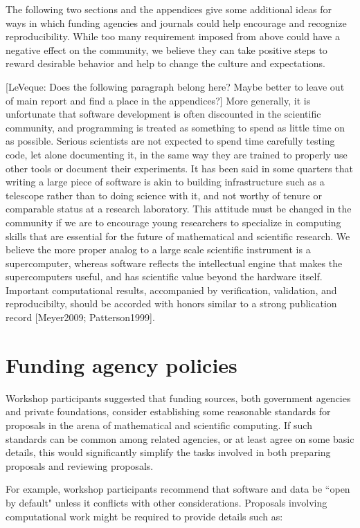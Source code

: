 \documentclass[11pt]{article}
\newcommand{\comment}[1]{{\color{blue} [#1]}}
\newcommand{\comment}[1]{}
\begin{document}
The following two sections and the appendices give some additional 
ideas for ways in which funding agencies and journals could help encourage
and recognize reproducibility.  While too many requirement imposed from
above could have a negative effect on the community, we believe they can
take positive steps to reward desirable behavior and help to change the
culture and expectations.

\comment{LeVeque:  Does the following paragraph belong here? Maybe better to
leave out of main report and find a place in the appendices?}
More generally, it is unfortunate that software development is often
discounted in the scientific community, and programming is treated
as something to spend as little time on as possible.  Serious
scientists are not expected to spend time carefully testing code,
let alone documenting it, in the same way they are trained to
properly use other tools or document their experiments.  It has
been said in some quarters that writing a large piece of software
is akin to building infrastructure such as a telescope rather than
to doing science with it, and not worthy of tenure or comparable
status at a research laboratory.  This attitude must be changed in
the community if we are to encourage young researchers to specialize
in computing skills that are essential for the future of mathematical
and scientific research.  We believe the more proper analog to a
large scale scientific instrument is a supercomputer,  whereas
software reflects the intellectual engine that makes the supercomputers
useful, and has scientific value beyond the hardware itself.
Important computational results, accompanied by verification,
validation, and reproducibilty, should be accorded with honors
similar to a strong publication record [Meyer2009; Patterson1999].


\section{Funding agency policies} \label{sec:funding}

Workshop participants suggested that funding sources, both government
agencies and private foundations, consider establishing some reasonable
standards for proposals in the arena of mathematical and scientific
computing.  If such standards can be common among related agencies, or at
least agree on some basic details, this would significantly simplify the
tasks involved in both preparing proposals and reviewing proposals.

For example, workshop participants recommend that software and data be ``open
by default" unless it conflicts with other considerations. 
Proposals involving computational work might
be required to provide details such as:
\end{document}
